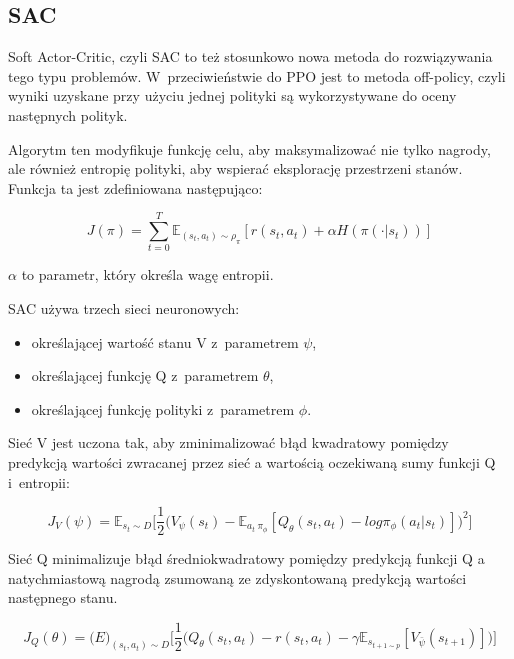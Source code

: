 \documentclass[a4paper,12pt]{article}
\begin{document}
\subsection{SAC}

Soft Actor-Critic, czyli SAC to też stosunkowo nowa metoda do rozwiązywania tego typu problemów. W~przeciwieństwie do PPO jest to metoda off-policy, czyli wyniki uzyskane przy użyciu jednej polityki są wykorzystywane do oceny następnych polityk.

Algorytm ten modyfikuje funkcję celu, aby maksymalizować nie tylko nagrody, ale również entropię polityki, aby wspierać eksplorację przestrzeni stanów. Funkcja ta jest zdefiniowana następująco:

\begin{equation}
	J(\pi) = \sum_{t=0}^T \mathbb{E}_{(s_t,a_t) \sim \rho_\pi} [r(s_t,a_t) + \alpha H(\pi(\cdot |s_t))]
\end{equation}

$\alpha$ to parametr, który określa wagę entropii.

SAC używa trzech sieci neuronowych:
\begin{itemize}
	\item określającej wartość stanu V z~parametrem $\psi$,
	\item określającej funkcję Q z~parametrem $\theta$,
	\item określającej funkcję polityki z~parametrem $\phi$.
\end{itemize}

Sieć V jest uczona tak, aby zminimalizować błąd  kwadratowy pomiędzy predykcją wartości zwracanej przez sieć a wartością oczekiwaną sumy funkcji Q i~entropii:

\begin{equation}
J_V(\psi) = \mathbb{E}_{s_t \sim D}\Big[ \frac{1}{2}\big(V_\psi(s_t) - \mathbb{E}_{a_t ~\pi_\phi} [Q_\theta(s_t,a_t) - log \pi_\phi (a_t|s_t)] \big)^2\Big]
\end{equation}

Sieć Q minimalizuje błąd średniokwadratowy pomiędzy predykcją funkcji Q a natychmiastową nagrodą zsumowaną ze zdyskontowaną predykcją wartości następnego stanu.

\begin{equation}
	J_Q(\theta) = \mathbb(E)_{(s_t,a_t) \sim D}\Big[
		\frac{1}{2} \big(
			Q_\theta(s_t,a_t) - r(s_t,a_t) - \gamma \mathbb{E}_{s_{t+1 \sim p}}[V_{\bar{\psi}}(s_{t+1})]
		\big)
	\Big]
\end{equation}
\end{document}
